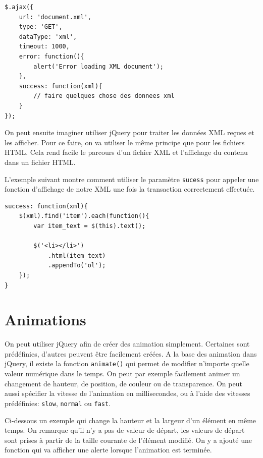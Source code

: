 \documentclass[10pt,a4paper,titlepage]{article}
\begin{document}
\begin{lstlisting}
$.ajax({
    url: 'document.xml',
    type: 'GET',
    dataType: 'xml',
    timeout: 1000,
    error: function(){
        alert('Error loading XML document');
    },
    success: function(xml){
        // faire quelques chose des donnees xml
    }
});
\end{lstlisting}

On peut ensuite imaginer utiliser jQuery pour traiter les données XML reçues et les afficher. Pour ce faire, on va utiliser le même principe que pour les fichiers HTML. Cela rend facile le parcours d'un fichier XML et l'affichage du contenu dans un fichier HTML.

L'exemple suivant montre comment utiliser le paramètre \texttt{sucess} pour appeler une fonction d'affichage de notre XML une fois la transaction correctement effectuée.

\begin{lstlisting}
success: function(xml){
    $(xml).find('item').each(function(){
        var item_text = $(this).text();

        $('<li></li>')
            .html(item_text)
            .appendTo('ol');
    });
}
\end{lstlisting}

\newpage
\section{Animations}

On peut utiliser jQuery afin de créer des animation simplement. Certaines sont prédéfinies, d'autres peuvent être facilement créées. A la base des animation dans jQuery, il existe la fonction \texttt{animate()} qui permet de modifier n'importe quelle valeur numérique dans le temps. On peut par exemple facilement animer un changement de hauteur, de position, de couleur ou de transparence. On peut aussi spécifier la vitesse de l'animation en millisecondes, ou à l'aide des vitesses prédéfinies: \texttt{slow}, \texttt{normal} ou \texttt{fast}.

Ci-dessous un exemple qui change la hauteur et la largeur d'un élément en même temps. On remarque qu'il n'y a pas de valeur de départ, les valeurs de départ sont prises à partir de la taille courante de l'élément modifié. On y a ajouté une fonction qui va afficher une alerte lorsque l'animation est terminée.
\end{document}
